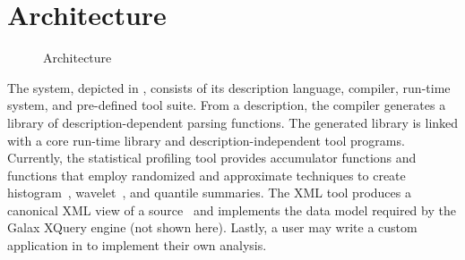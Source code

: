 \section{Architecture}
\label{section:pads}


\begin{figure}
  \begin{center}
  \end{center}
  \caption{\pads{} Architecture}
  \label{figure:arch}
\end{figure}

The \pads{} system, depicted in , consists of its
description language, compiler, run-time system, and pre-defined tool
suite.  From a description, the compiler generates a library of
description-dependent parsing functions.  The generated library is
linked with a core run-time library and description-independent tool
programs.  Currently, the statistical profiling tool provides
accumulator functions and functions that employ randomized and
approximate techniques to create histogram~\cite{histograms},
wavelet~\cite{histograms-wavelets}, and quantile
summaries\cite{quantiles}.  The XML tool produces a canonical XML view
of a \pads{} source~\cite{fernandez+:padx} and implements the data
model required by the Galax XQuery engine (not shown here).
  Lastly, a user may write a custom
application in \C{} to implement their own analysis.

